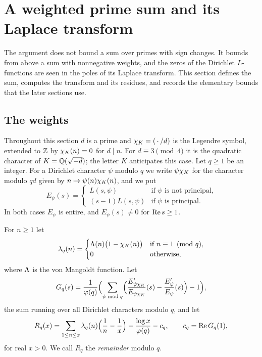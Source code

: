 \section{A weighted prime sum and its Laplace transform}\label{sec:transform}

The argument does not bound a sum over primes with sign changes. It bounds from above a sum with
nonnegative weights, and the zeros of the Dirichlet $L$-functions are seen in the poles of its
Laplace transform. This section defines the sum, computes the transform and its residues, and
records the elementary bounds that the later sections use.

\subsection{The weights}\label{ss:weights}
Throughout this section $d$ is a prime and $\chi_K=(\,\cdot\,/d)$ is the Legendre symbol, extended
to $\mathbb{Z}$ by $\chi_K(n)=0$ for $d\mid n$. For $d\equiv 3\pmod 4$ it is the quadratic character of
$K=\mathbb{Q}(\sqrt{-d})$; the letter $K$ anticipates this case. Let $q\ge 1$ be an integer. For a
Dirichlet character $\psi$ modulo $q$ we write $\psi\chi_K$ for the character modulo $qd$ given by
$n\mapsto\psi(n)\chi_K(n)$, and we put
\[
  E_\psi(s)=
  \begin{cases}
    L(s,\psi) & \text{if $\psi$ is not principal,}\\
    (s-1)L(s,\psi) & \text{if $\psi$ is principal.}
  \end{cases}
\]
In both cases $E_\psi$ is entire, and $E_\psi(s)\neq0$ for $\operatorname{Re} s\ge1$.

\begin{definition}\label{def:lambda}
For $n\ge1$ let
\[
  \lambda_q(n)=
  \begin{cases}
    \Lambda(n)\bigl(1-\chi_K(n)\bigr) & \text{if } n\equiv 1\pmod q,\\
    0 & \text{otherwise,}
  \end{cases}
\]
where $\Lambda$ is the von Mangoldt function. Let
\[
  G_q(s)=\frac{1}{\varphi(q)}\Bigl(\sum_{\psi\bmod q}
    \Bigl(\frac{E_{\psi\chi_K}'}{E_{\psi\chi_K}}(s)-\frac{E_\psi'}{E_\psi}(s)\Bigr)-1\Bigr),
\]
the sum running over all Dirichlet characters modulo $q$, and let
\begin{equation}\label{eq:Rq}
  R_q(x)=\sum_{1\le n\le x}\lambda_q(n)\Bigl(\frac1n-\frac1x\Bigr)-\frac{\log x}{\varphi(q)}-c_q,
  \qquad c_q=\operatorname{Re} G_q(1),
\end{equation}
for real $x>0$. We call $R_q$ the \emph{remainder} modulo $q$.
\end{definition}

